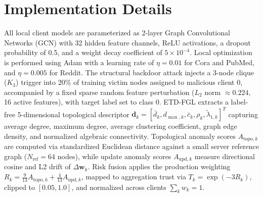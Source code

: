 \section{Implementation Details}
\label{sec:implementation_details}
All local client models are parameterized as 2-layer Graph Convolutional Networks (\textsc{GCN}) with 32 hidden feature channels, ReLU activations, a dropout probability of 0.5, and a weight decay coefficient of $5 \times 10^{-4}$.
Local optimization is performed using Adam with a learning rate of $\eta = 0.01$ for Cora and PubMed, and $\eta = 0.005$ for Reddit.
The structural backdoor attack injects a 3-node clique ($K_3$) trigger into 20\% of training victim nodes assigned to malicious client 0, accompanied by a fixed sparse random feature perturbation ($L_2$ norm $\approx 0.224$, 16 active features), with target label set to class 0.
\textsc{ETD-FGL} extracts a label-free 5-dimensional topological descriptor $\mathbf{d}_k = [ \bar{d}_k, d_{\max,k}, \bar{c}_k, \rho_k, \tilde{\lambda}_{1,k} ]^T$ capturing average degree, maximum degree, average clustering coefficient, graph edge density, and normalized algebraic connectivity.
Topological anomaly scores $A_{\text{topo},k}$ are computed via standardized Euclidean distance against a small server reference graph ($N_{\text{ref}} = 64$ nodes), while update anomaly scores $A_{\text{upd},k}$ measure directional cosine and L2 drift of $\Delta \mathbf{w}_k$.
Risk fusion applies the production weighting $R_k = \frac{9}{13} A_{\text{topo},k} + \frac{4}{13} A_{\text{upd},k}$, mapped to aggregation trust via $T_k = \exp(-3 R_k)$, clipped to $[0.05, 1.0]$, and normalized across clients $\sum_k w_k = 1$.
